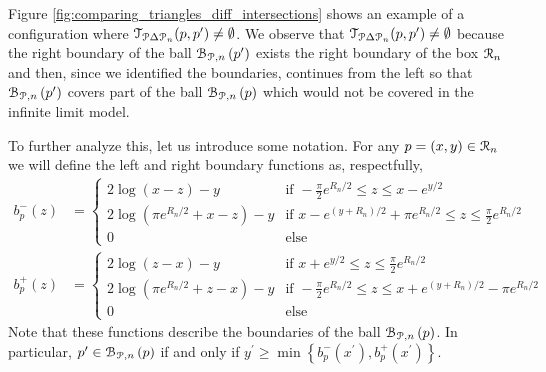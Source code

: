 Figure \ref{fig:comparing_triangles_diff_intersections} shows an example of a configuration where $\mathcal{T}_{{\mathcal P} \Delta {\mathcal P}_n}(p,p^\prime) \ne \emptyset$. We observe that $\mathcal{T}_{{\mathcal P} \Delta {\mathcal P}_n}(p,p^\prime) \ne \emptyset$ because the right boundary of the ball ${\mathcal B}_{{\mathcal P},n}\left(p^\prime\right)$ exists the right boundary of the box ${\mathcal R}_n$ and then, since we identified the boundaries, continues from the left so that ${\mathcal B}_{{\mathcal P},n}\left(p^\prime\right)$ covers part of the ball ${\mathcal B}_{{\mathcal P},n}\left(p\right)$ which would not be covered in the infinite limit model. 

To further analyze this, let us introduce some notation. For any $p = (x,y) \in {\mathcal R}_n$ we will define the left and right boundary functions as, respectfully,
\begin{align}
	b_p^-(z) &= \begin{cases}
		2 \log\left(x-z\right) - y &\mbox{if }  -\frac{\pi}{2} e^{R_n/2} \le z \le x - e^{y/2}  \\
		2\log\left(\pi e^{R_n/2} + x - z\right) - y 
			&\mbox{if } x - e^{(y + R_n)/2} + \pi e^{R_n/2} \le z \le \frac{\pi}{2} e^{R_n/2}\\
		0 &\mbox{else}
	\end{cases}\\
	b_p^+(z) &= \begin{cases}
		2 \log\left(z-x\right) - y &\mbox{if } x + e^{y/2} \le z \le \frac{\pi}{2} e^{R_n/2} \\
		2\log\left(\pi e^{R_n/2} + z - x\right) - y 
			&\mbox{if } -\frac{\pi}{2} e^{R_n/2} \le z \le x + e^{(y + R_n)/2} - \pi e^{R_n/2}\\
		0 &\mbox{else}
	\end{cases}
\end{align}
Note that these functions describe the boundaries of the ball ${\mathcal B}_{{\mathcal P},n}\left(p\right)$. In particular, $p^\prime \in {\mathcal B}_{{\mathcal P},n}\left(p\right)$ if and only if $y^\prime \ge \min\left\{b_p^-(x^\prime), b_p^+(x^\prime)\right\}$.

